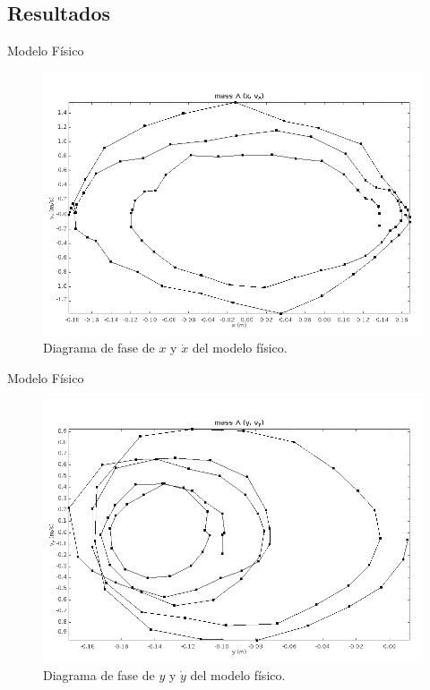 \documentclass{beamer}
\begin{document}
\subsection{Resultados}
\begin{frame}{Modelo Físico}
 \begin{figure}[h]
 \centering
 \includegraphics[scale=0.2]{../Report/img/tracker_poc_phasediagram_x_vx.png}
 \caption{Diagrama de fase de $x$ y $\dot{x}$ del modelo físico.}
 \label{fig: tracker phase diagram x vx}
\end{figure}

\end{frame}

\begin{frame}{Modelo Físico}
 \begin{figure}[h]
 \centering
 \includegraphics[scale=0.2]{../Report/img/tracker_poc_phasediagram_y_vy.png}
 \caption{Diagrama de fase de $y$ y $\dot{y}$ del modelo físico.}
 \label{fig: tracker phase diagram y vy}
\end{figure}

\end{frame}
\end{document}
